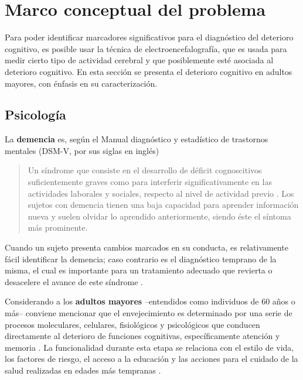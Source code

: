 
\chapter{Marco conceptual del problema}

Para poder identificar marcadores significativos para el diagnóstico del deterioro cognitivo, es 
posible usar la técnica de electroencefalografía, que es usada para medir cierto tipo de actividad 
cerebral y que posiblemente esté asociada al deterioro cognitivo. 
%
En esta sección se presenta el deterioro cognitivo en adultos mayores, con énfasis en su 
caracterización.


\section{Psicología}

La \textbf{demencia} es, según el Manual diagnóstico y estadístico de trastornos mentales 
(DSM-V, por sus siglas en inglés)
\begin{quote}
Un síndrome que consiste en el desarrollo de déficit cognoscitivos suficientemente graves como para 
interferir significativamente en las actividades laborales y sociales, respecto al nivel de 
actividad previo \cite{DCM5}.
%
Los sujetos con demencia tienen una baja capacidad para aprender información nueva y suelen olvidar 
lo aprendido anteriormente, siendo éste el síntoma más prominente.
\end{quote}

Cuando un sujeto presenta cambios marcados en su conducta, es relativamente fácil identificar la 
demencia; caso contrario es el diagnóstico temprano de la misma, el cual es importante para un 
tratamiento adecuado que revierta o desacelere el avance de este síndrome \cite{Knopman01}.

Considerando a los \textbf{adultos mayores} --entendidos como individuos de 60 años o más--
conviene mencionar que el envejecimiento es determinado por una serie de procesos moleculares, 
celulares, fisiológicos y psicológicos que conducen directamente al deterioro de funciones 
cognitivas, específicamente atención y memoria \cite{Park09}.
%
La funcionalidad durante esta etapa se relaciona con el estilo de vida, los factores de riesgo, el 
acceso a la educación y las acciones para el cuidado de la salud realizadas en edades más 
tempranas \cite{Sanhueza14}.

